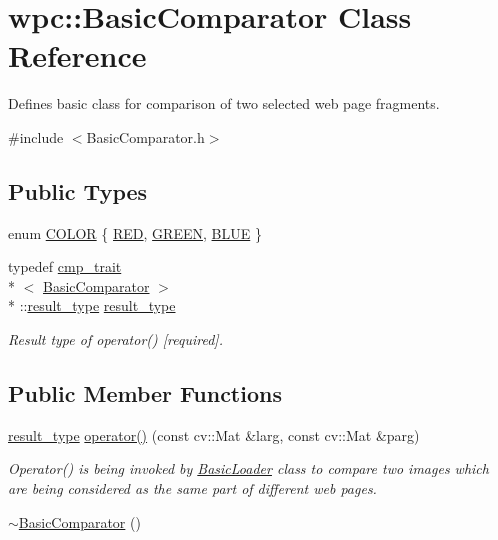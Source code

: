 \hypertarget{classwpc_1_1_basic_comparator}{\section{wpc\-:\-:Basic\-Comparator Class Reference}
\label{classwpc_1_1_basic_comparator}
}


Defines basic class for comparison of two selected web page fragments.  




{\ttfamily \#include $<$Basic\-Comparator.\-h$>$}

\subsection*{Public Types}
\begin{DoxyCompactItemize}
\item 
enum \hyperlink{classwpc_1_1_basic_comparator_a95f6a6f66cb3a479371c101a35eebb6b}{C\-O\-L\-O\-R} \{ \hyperlink{classwpc_1_1_basic_comparator_a95f6a6f66cb3a479371c101a35eebb6ba8f07deb101c3ce46cdf92b7c4c14f01a}{R\-E\-D}, 
\hyperlink{classwpc_1_1_basic_comparator_a95f6a6f66cb3a479371c101a35eebb6bac4227992631e0fe13fcff5fafa0d2ea2}{G\-R\-E\-E\-N}, 
\hyperlink{classwpc_1_1_basic_comparator_a95f6a6f66cb3a479371c101a35eebb6baa4b78df226b5ed9886721fb9d81b7504}{B\-L\-U\-E}
 \}
\item 
typedef \hyperlink{structwpc_1_1cmp__trait}{cmp\-\_\-trait}\\*
$<$ \hyperlink{classwpc_1_1_basic_comparator}{Basic\-Comparator} $>$\\*
\-::\hyperlink{classwpc_1_1_basic_comparator_af93928e437d832b942be5396c4f453d1}{result\-\_\-type} \hyperlink{classwpc_1_1_basic_comparator_af93928e437d832b942be5396c4f453d1}{result\-\_\-type}
\begin{DoxyCompactList}\small\item\em Result type of operator() \mbox{[}required\mbox{]}. \end{DoxyCompactList}\end{DoxyCompactItemize}
\subsection*{Public Member Functions}
\begin{DoxyCompactItemize}
\item 
\hyperlink{classwpc_1_1_basic_comparator_af93928e437d832b942be5396c4f453d1}{result\-\_\-type} \hyperlink{classwpc_1_1_basic_comparator_aa73bc7915f828f313230c344fc2214cb}{operator()} (const cv\-::\-Mat \&larg, const cv\-::\-Mat \&parg)
\begin{DoxyCompactList}\small\item\em Operator() is being invoked by \hyperlink{classwpc_1_1_basic_loader}{Basic\-Loader} class to compare two images which are being considered as the same part of different web pages. \end{DoxyCompactList}\item 
\hyperlink{classwpc_1_1_basic_comparator_a319095093ff9a3411515721d73c1ba8d}{$\sim$\-Basic\-Comparator} ()
\end{DoxyCompactItemize}

